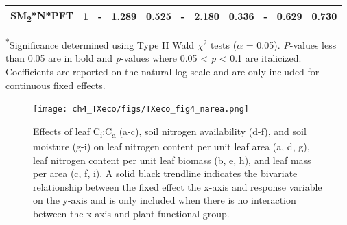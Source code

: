 \begin{landscape}
\begin{table}
{\begin{tabular}{p{3.75cm}p{0.5cm}p{1.75cm}p{1.5cm}p{1.5cm}p{1.75cm}p{1.5cm}p{1.5cm}p{1.75cm}p{1.5cm}p{1.5cm}}
            SM\textsubscript{2}*N*PFT & \multicolumn{1}{r}{1}
            & \multicolumn{1}{r}{-}             & \multicolumn{1}{r}{1.289}         & \multicolumn{1}{r}{0.525}
            & \multicolumn{1}{r}{-}             & \multicolumn{1}{r}{2.180}         & \multicolumn{1}{r}{0.336}
            & \multicolumn{1}{r}{-}             & \multicolumn{1}{r}{0.629}         & \multicolumn{1}{r}{0.730}
            \\
            \hline

    \end{tabular}}
    \label{tab:table4.4}
    \end{table}
    \noindent \textsuperscript{$*$}Significance determined using Type II Wald $\chi^{2}$ tests ($\alpha$ = 0.05). \textit{P}-values less than 0.05 are in bold and \textit{p}-values where 0.05 < \textit{p} < 0.1 are italicized. Coefficients are reported on the natural-log scale and are only included for continuous fixed effects.
\end{landscape}
\clearpage

\newpage
    \begin{figure}
        \centering
        \texttt{[image: ch4\_TXeco/figs/TXeco\_fig4\_narea.png]}
        \caption[Effects of leaf C\textsubscript{i}:C\textsubscript{a}, soil nitrogen availability, and soil moisture on leaf nitrogen content per unit leaf area, leaf nitrogen content per unit leaf biomass, and leaf mass per area.]{Effects of leaf C\textsubscript{i}:C\textsubscript{a} (a-c), soil nitrogen availability (d-f), and soil moisture (g-i) on leaf nitrogen content per unit leaf area (a, d, g), leaf nitrogen content per unit leaf biomass (b, e, h), and leaf mass per area (c, f, i). A solid black trendline indicates the bivariate relationship between the fixed effect the x-axis and response variable on the y-axis and is only included when there is no interaction between the x-axis and plant functional group.}
        \label{fig:figure4.4}
    \end{figure}
\clearpage

